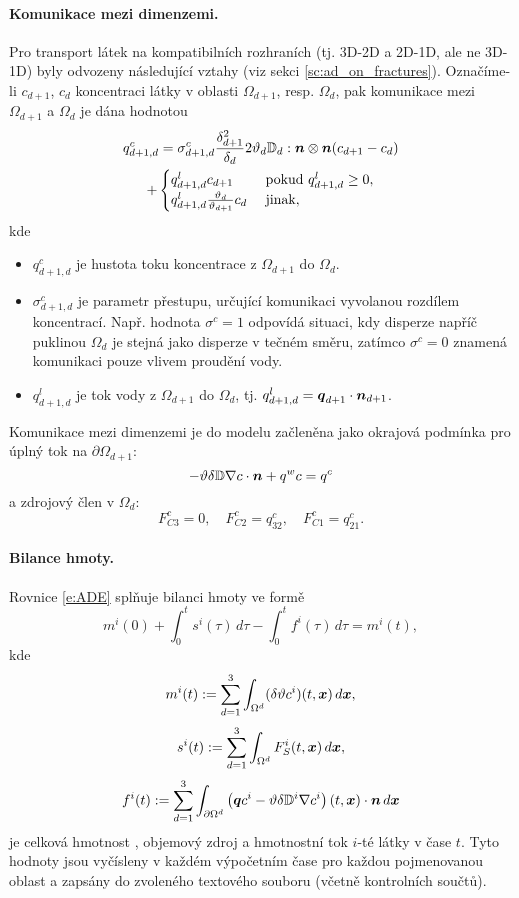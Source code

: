 \paragraph{Komunikace mezi dimenzemi.}
Pro transport látek na kompatibilních rozhraních (tj. 3D-2D a 2D-1D, ale ne 3D-1D) byly odvozeny následující vztahy (viz sekci \ref{sc:ad_on_fractures}).
Označíme-li $c_{d+1}$, $c_d$ koncentraci látky v oblasti $\Omega_{d+1}$, resp. $\Omega_d$, pak komunikace mezi $\Omega_{d+1}$ a $\Omega_d$ je dána hodnotou
\begin{multline}
  \label{e:inter_dim_flux}
  q^c_{d+1,d} = \sigma^c_{d+1,d} \frac{\delta_{d+1}^2}{\delta_d}2\vartheta_d{{\mathbb{D}}}_d:\mathbf{\boldsymbol{n}}\otimes\mathbf{\boldsymbol{n}} ( c_{d+1} - c_d)\\
  + \begin{cases}q^l_{d+1,d} c_{d+1} & \mbox{ pokud }q^l_{d+1,d}\ge 0,\\q^l_{d+1,d} \frac{\vartheta_d}{\vartheta_{d+1}} c_d & \mbox{ jinak},\end{cases}
\end{multline}
kde
\begin{itemize}
\item $q^c_{d+1,d}$  je hustota toku koncentrace z $\Omega_{d+1}$ do $\Omega_d$.
\item $\sigma^c_{d+1,d}$ \units{}{}{} je parametr přestupu, určující komunikaci vyvolanou rozdílem koncentrací.
Např. hodnota $\sigma^c=1$ odpovídá situaci, kdy disperze napříč puklinou $\Omega_d$ je stejná jako disperze v tečném směru, zatímco $\sigma^c=0$ znamená komunikaci pouze vlivem proudění vody.
\item $q^l_{d+1,d}$  je tok vody z $\Omega_{d+1}$ do $\Omega_d$, tj. $q^l_{d+1,d} = \mathbf{\boldsymbol{q}}_{d+1}\cdot\mathbf{\boldsymbol{n}}_{d+1}$.
\end{itemize}
Komunikace mezi dimenzemi je do modelu začleněna jako okrajová podmínka pro úplný tok na $\partial\Omega_{d+1}$:
\begin{equation}
\label{e:FC}
-\vartheta\delta{{\mathbb{D}}}\nabla c\cdot\mathbf{\boldsymbol{n}} + q^w c = q^c
\end{equation}
a zdrojový člen v $\Omega_d$:
\begin{equation}
F^c_{C3} = 0,\quad
F^c_{C2} = q^c_{32},\quad
F^c_{C1} = q^c_{21}.
\end{equation}



\paragraph{Bilance hmoty.}
Rovnice \eqref{e:ADE} splňuje bilanci hmoty ve formě
$$ m^i(0) + \int_0^t s^i(\tau) \,d\tau - \int_0^t f^i(\tau) \,d\tau = m^i(t), $$
kde
$$ m^i(t) := \sum_{d=1}^3\int_{\Omega^d}(\delta\vartheta c^i)(t,\mathbf{\boldsymbol{x}})\,d\mathbf{\boldsymbol{x}}, $$
$$ s^i(t) := \sum_{d=1}^3\int_{\Omega^d}F_S^i(t,\mathbf{\boldsymbol{x}})\,d\mathbf{\boldsymbol{x}}, $$
$$ f^i(t) := \sum_{d=1}^3\int_{\partial\Omega^d}\left(\mathbf{\boldsymbol{q}} c^i - \vartheta\delta{{\mathbb{D}}}^i\nabla c^i\right)(t,\mathbf{\boldsymbol{x}})\cdot\mathbf{\boldsymbol{n}} \,d\mathbf{\boldsymbol{x}} $$
je celková hmotnost , objemový zdroj  a hmotnostní tok  $i$-té látky v čase $t$.
Tyto hodnoty jsou vyčísleny v každém výpočetním čase pro každou pojmenovanou oblast a zapsány do zvoleného textového souboru (včetně kontrolních součtů).






